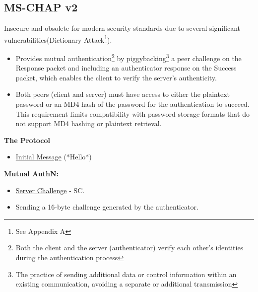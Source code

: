 \subsection{MS-CHAP v2}
\begin{center}
    Insecure and obsolete for modern security standards due \newline to several significant vulnerabilities(Dictionary Attack\footnote{See Appendix A}).
\end{center}
\begin{itemize}
    \item Provides mutual authentication\footnote{Both the client and the server (authenticator) verify each other’s identities during the authentication process} by piggybacking\footnote{The practice of sending additional data or control information within an existing communication, avoiding a separate or additional transmission} a peer challenge on the Response packet and including an authenticator response on the Success packet, which enables the client to verify the server’s authenticity.
    \item Both peers (client and server) must have access to either the plaintext password or an MD4 hash of the password for the authentication to succeed. This requirement limits compatibility with password storage formats that do not support MD4 hashing or plaintext retrieval.
\end{itemize}

\begin{center}
    \textbf{The Protocol}
\end{center}
\begin{tcolorbox}[colback=yellow!10!white, colframe=yellow!70!black, title=Peer \textrightarrow Authenticator] 
    
    \begin{itemize}
        \item \underline{Initial Message} (*Hello*)
    \end{itemize}
    
\end{tcolorbox}

\textbf{Mutual AuthN:}
\begin{tcolorbox}[colback=yellow!10!white, colframe=yellow!70!black, title=Authenticator \textrightarrow Peer] 
    
    \begin{itemize}
        \item \underline{Server Challenge} - SC.
        \item Sending a 16-byte challenge generated by the authenticator.
    \end{itemize}
    
\end{tcolorbox}

